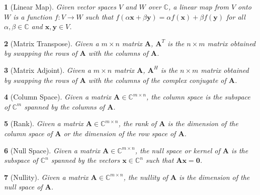 \documentclass{article}
\theoremstyle{bolddef}
\newtheorem*{definition}{}
\begin{document}
\begin{definition}[Linear Map]
    Given vector spaces $\mathit{V}$ and $\mathit{W}$ over $\mathbb{C}$, a linear map from
    $\mathit{V}$ onto $\mathit{W}$ is a function $\mathit{f}:\mathit{V} \to \mathit{W}$
    such that $\mathit{f}(\alpha \mathbf{x} + \beta \mathbf{y}) = \alpha \mathit{f}(\mathbf{x}) + \beta \mathit{f}(\mathbf{y})$
    for all $\alpha, \beta \in \mathbb{C}$ and $\mathbf{x}, \mathbf{y} \in \mathit{V}$.
\end{definition}

\begin{definition}[Matrix Transpose]
    Given a $m \times n$ matrix $\mathbf{A}$, $\mathbf{A}^{T}$ is the $n \times m$
    matrix obtained by swapping the rows of $\mathbf{A}$ with the columns of $\mathbf{A}$.
\end{definition}

\begin{definition}[Matrix Adjoint]
    Given a $m \times n$ matrix $\mathbf{A}$, $\mathbf{A}^{H}$ is the $n \times m$
    matrix obtained by swapping the rows of $\mathbf{A}$ with the columns of the complex conjugate of $\mathbf{A}$.
\end{definition}

\begin{definition}[Column Space]
    Given a matrix $\mathbf{A} \in \mathbb{C}^{m \times n}$, the column space is the
    subspace of $\mathbb{C}^{m}$ spanned by the columns of $\mathbf{A}$.
\end{definition}

\begin{definition}[Rank]
    Given a matrix $\mathbf{A} \in \mathbb{C}^{m \times n}$, the rank of $\mathbf{A}$ is the dimension of 
    the column space of $\mathbf{A}$ or the dimension of the row space of $\mathbf{A}$.
\end{definition}

\begin{definition}[Null Space]
    Given a matrix $\mathbf{A} \in \mathbb{C}^{m \times n}$, the null space or kernel of 
    $\mathbf{A}$ is the subspace of $\mathbb{C}^{n}$ spanned by the vectors $\mathbf{x} \in \mathbb{C}^{n}$
    such that $\mathbf{A} \mathbf{x}  = \mathbf{0}$.
\end{definition}

\begin{definition}[Nullity]
    Given a matrix $\mathbf{A} \in \mathbb{C}^{m \times n}$, the nullity of $\mathbf{A}$
    is the dimension of the null space of $\mathbf{A}$.
\end{definition}
\end{document}
